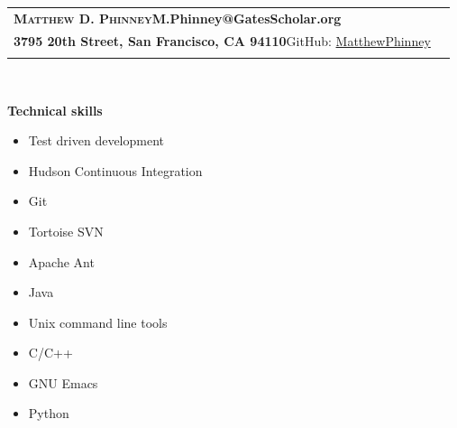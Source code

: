 \documentclass[letterpaper,11pt]{article}
\newcommand{\resitem}[1]{\item #1 \vspace{-1pt}}
\newcommand{\resheading}[1]{{\large \colorbox{mygrey}{\begin{minipage}{\textwidth}{\textbf{#1 \vphantom{p\^{E}}}}\end{minipage}}}}
\begin{document}
\renewcommand{\baselinestretch}{1}
 \normalsize

\newcommand{\mywebheader}{
\begin{tabular*}{7in}{l@{\extracolsep{\fill}}r}
	\textbf{{\Huge \textsc{{Matthew D. Phinney}}}}\hfill{\textbf{{M.Phinney@GatesScholar.org}}}\\
	{\textbf{{3795 20th Street, San Francisco, CA 94110}}}\hfill{GitHub: \href{https://github.com/MatthewPhinney}{MatthewPhinney}} \vspace{0.05in}\\
	\fbox{\parbox{\textwidth}{I am a developer looking to apply my skills to technical, data--driven projects.  My comprehensive knowledge of algorithms and conscientious approach to problem solving allows me to write clean code with superior performance characteristics.  I excel in an environment that fosters creativity, encourages collaboration, and demands polished results, and I look forward to discussing how I might contribute to your team.}}\vspace{0.05in}\\
	\end{tabular*}
\\
\vspace{0.15in}}

\mywebheader


\resheading{\Large{Technical skills}}
\begin{multicols}{2}
	\begin{itemize}
	\large
		\resitem{Test driven development}
		\resitem{Hudson Continuous Integration}
		\resitem{Git}
		\resitem{Tortoise SVN}
		\resitem{Apache Ant}
		\resitem{Java}
		\resitem{Unix command line tools}
		\resitem{C/C++}
		\resitem{GNU Emacs}
		\resitem{Python}
	\end{itemize}
\end{multicols}
\end{document}
